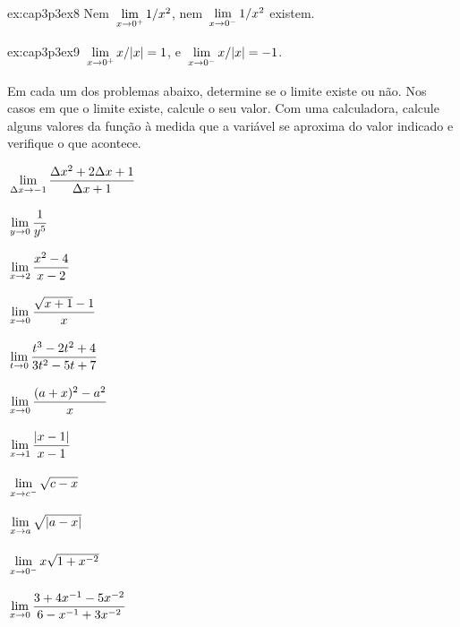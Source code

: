 \begin{examplecont}{ex:cap3p3ex8} \; Nem \; $\dslim{x \to 0^+} 1/x^2$,
  \hspace{1.5em} nem \hspace{1.5em} $\dslim{x \to 0^-} 1/x^2$ \; existem.
\end{examplecont}

\begin{examplecont}{ex:cap3p3ex9} \; $\dslim{x \to 0^+} x/|x| = 1$,
  \hspace{1.5em} e \hspace{1.5em} $\dslim{x \to 0^-} x/|x| = -1$.
\end{examplecont}

\begin{sectionproblems}
Em cada um dos problemas abaixo, determine se o limite existe ou não.
Nos casos em que o limite existe, calcule o seu valor. Com uma calculadora,
calcule alguns valores da função à medida que a variável se aproxima do 
valor indicado e verifique o que acontece.

%
        {$\dslim{\Dx \to -1} \dfrac{\Dx^2 + 2\Dx + 1}{\Dx + 1}$}

%
        {$\dslim{y \to 0} \dfrac{1}{y^5}$}

%
        {$\dslim{x \to 2} \dfrac{x^2 - 4}{x - 2}$}

%
        {$\dslim{x \to 0} \dfrac{\sqrt{x + 1} - 1}{x}$}

%
        {$\dslim{t \to 0} \dfrac{t^3-2t^2+4}{3t^2-5t+7}$}

%
        {$\dslim{x \to 0} \dfrac{(a + x)^2 - a^2}{x}$}

%
        {$\dslim{x \to 1} \dfrac{|x-1|}{x-1}$}

%
        {$\dslim{x \to c^-} \sqrt{c-x}$}

%
        {$\dslim{x \to a} \sqrt{|a-x|}$}

%
        {$\dslim{x \to 0^-} x \sqrt{1 + x^{-2}}$}

%
        {$\dslim{x \to 0} \dfrac{3 + 4x^{-1} - 5x^{-2}}{6-x^{-1}+3x^{-2}}$}


\end{sectionproblems}
